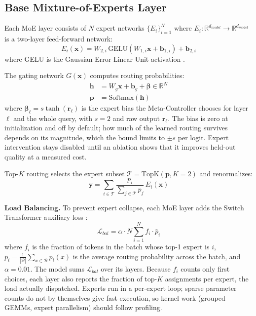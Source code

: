 \documentclass{article}
\begin{document}
\subsection{Base Mixture-of-Experts Layer}

Each MoE layer consists of $N$ expert networks $\{E_i\}_{i=1}^N$ where $E_i: \mathbb{R}^{d_{model}} \to \mathbb{R}^{d_{model}}$ is a two-layer feed-forward network:
\begin{equation}
E_i(\mathbf{x}) = W_{2,i} \, \text{GELU}(W_{1,i} \mathbf{x} + \mathbf{b}_{1,i}) + \mathbf{b}_{2,i}
\end{equation}
where GELU is the Gaussian Error Linear Unit activation \cite{hendrycks2016gelu}.

The gating network $G(\mathbf{x})$ computes routing probabilities:
\begin{align}
\mathbf{h} &= W_g \mathbf{x} + \mathbf{b}_g + \boldsymbol{\beta} \in \mathbb{R}^N \\
\mathbf{p} &= \text{Softmax}(\mathbf{h})
\end{align}
where $\boldsymbol{\beta}_\ell = s \tanh(\mathbf{r}_\ell)$ is the expert bias the Meta-Controller chooses for layer $\ell$ and the whole query, with $s = 2$ and raw output $\mathbf{r}_\ell$. The bias is zero at initialization and off by default; how much of the learned routing survives depends on its magnitude, which the bound limits to $\pm s$ per logit. Expert intervention stays disabled until an ablation shows that it improves held-out quality at a measured cost.

Top-$K$ routing selects the expert subset $\mathcal{T} = \text{TopK}(\mathbf{p}, K=2)$ and renormalizes:
\begin{equation}
\mathbf{y} = \sum_{i \in \mathcal{T}} \frac{p_i}{\sum_{j \in \mathcal{T}} p_j} \, E_i(\mathbf{x})
\end{equation}

\textbf{Load Balancing.} To prevent expert collapse, each MoE layer adds the Switch Transformer auxiliary loss \cite{fedus2022switch}:
\begin{equation}
\mathcal{L}_{bal} = \alpha \cdot N \sum_{i=1}^N f_i \cdot \bar{p}_i
\end{equation}
where $f_i$ is the fraction of tokens in the batch whose top-1 expert is $i$, $\bar{p}_i = \frac{1}{|\mathcal{B}|}\sum_{x \in \mathcal{B}} p_i(x)$ is the average routing probability across the batch, and $\alpha=0.01$. The model sums $\mathcal{L}_{bal}$ over its layers. Because $f_i$ counts only first choices, each layer also reports the fraction of top-$K$ assignments per expert, the load actually dispatched. Experts run in a per-expert loop; sparse parameter counts do not by themselves give fast execution, so kernel work (grouped GEMMs, expert parallelism) should follow profiling.
\end{document}

